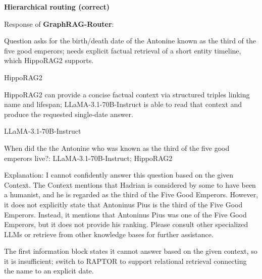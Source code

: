 \begin{tcolorbox}
\medskip

\begin{tcolorbox}[schemestrip]
\textbf{Hierarchical routing (correct)}
\end{tcolorbox}

Response of \textbf{GraphRAG-Router}: \par\medskip

Question asks for the birth/death date of the Antonine known as the third of the five good emperors; needs explicit factual retrieval of a short entity timeline, which HippoRAG2 supports. \par

HippoRAG2 \par

HippoRAG2 can provide a concise factual context via structured triples linking name and lifespan; LLaMA-3.1-70B-Instruct is able to read that context and produce the requested single-date answer. \par

LLaMA-3.1-70B-Instruct \par

{\raggedright
{}When did the the Antonine who was known as the third of the five good emperors live?: LLaMA-3.1-70B-Instruct; HippoRAG2\par
}

Explanation: I cannot confidently answer this question based on the given Context. The Context mentions that Hadrian is considered by some to have been a humanist, and he is regarded as the third of the Five Good Emperors. However, it does not explicitly state that Antoninus Pius is the third of the Five Good Emperors. Instead, it mentions that Antoninus Pius was one of the Five Good Emperors, but it does not provide his ranking. Please consult other specialized LLMs or retrieve from other knowledge bases for further assistance. \par

The first information block states it cannot answer based on the given context, so it is insufficient; switch to RAPTOR to support relational retrieval connecting the name to an explicit date. \par


\end{tcolorbox}
